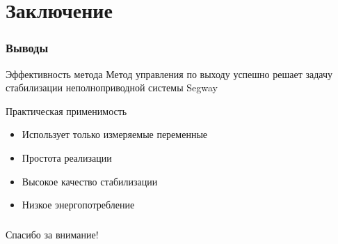 \documentclass[14pt,aspectratio=169]{beamer}
\begin{document}
\section{Заключение}



\begin{frame}
\frametitle{Выводы}
\begin{block}{Эффективность метода}
Метод управления по выходу успешно решает задачу стабилизации неполноприводной системы Segway
\end{block}

\begin{block}{Практическая применимость}
\begin{itemize}
    \item Использует только измеряемые переменные
    \item Простота реализации
    \item Высокое качество стабилизации
    \item Низкое энергопотребление
\end{itemize}
\end{block}
\end{frame}

\begin{frame}
\frametitle{}
\begin{center}
\Large Спасибо за внимание!
\end{center}
\end{frame}
\end{document}
